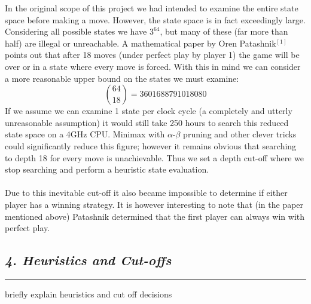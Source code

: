 \documentclass[10pt,twocolumn]{article}
\begin{document}
In the original scope of this project we had intended to examine the entire state space
before making a move. However, the state space is in fact exceedingly large. Considering all
possible states we have $3^{64}$, but many of these (far more than half) are illegal or unreachable.
A mathematical paper by Oren Patashnik$^{[1]}$ points out that after 18 moves (under perfect play by player 1)
the game will be over or in a state where every move is forced. With this in mind we can 
consider a more reasonable upper bound on the states we must examine:
 \[\binom{64}{18} = 3601688791018080\]
If we assume we can examine 1 state per clock cycle (a completely and utterly unreasonable assumption) it would
still take 250 hours to search this reduced state space on a 4GHz CPU. Minimax with $\alpha$-$\beta$ pruning
and other clever tricks could significantly reduce this figure; however it remains obvious that
searching to depth 18 for every move is unachievable. Thus we set a depth cut-off where we stop
searching and perform a heuristic state evaluation.\\\\
Due to this inevitable cut-off it also became impossible to determine if either
player has a winning strategy. It is however interesting to note that (in the paper
mentioned above) Patashnik determined that the first player can always win with perfect play. 

\subsection*{\emph { \textmd{4. Heuristics and Cut-offs}}}
\hrule
\vspace{0.4cm}
briefly explain heuristics and cut off decisions\\
\end{document}
